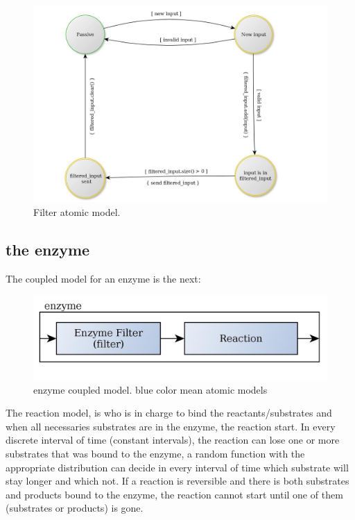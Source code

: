 \documentclass[12pt]{article}
\begin{document}
\begin{figure}[h!]
 \centering
  \includegraphics[width=1\textwidth]{atomic-filter.jpg}
 \caption{Filter atomic model.}
\end{figure}

\newpage
\subsection*{the enzyme}
The coupled model for an enzyme is the next:

\begin{figure}[h!]
 \centering
  \includegraphics[width=1\textwidth]{coupled-enzyme.jpg}
 \caption{enzyme coupled model. blue color mean atomic models}
\end{figure}

\newpage

The reaction model, is who is in charge to bind the reactants/substrates and when all necessaries substrates are in the enzyme, the reaction start.
In every discrete interval of time (constant intervals), the reaction can lose one or more substrates that was bound to the enzyme, a random function with the appropriate distribution can decide in every interval of time which substrate will stay longer and which not. If a reaction is reversible and there is both substrates and products bound to the enzyme, the reaction cannot start until one of them (substrates or products) is gone.
\end{document}
